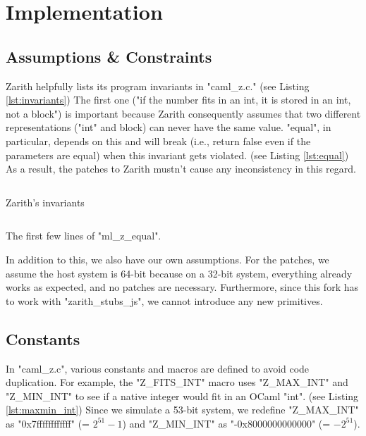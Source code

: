 \documentclass{scrartcl}
\begin{document}
\section{Implementation}

\subsection{Assumptions \& Constraints}

Zarith helpfully lists its program invariants in "caml\_z.c." (see Listing \ref{lst:invariants}) The first one ("if the number fits in an int, it is stored in an int, not a block") is important because Zarith consequently assumes that two different representations ("int" and block) can never have the same value. "equal", in particular, depends on this and will break (i.e., return false even if the parameters are equal) when this invariant gets violated. (see Listing \ref{lst:equal}) As a result, the patches to Zarith mustn't cause any inconsistency in this regard.

\begin{listing}[ht]
\inputminted[linenos, firstline=120, lastline=131]{c}{caml_z.c}
\caption{Zarith's invariants}
\label{lst:invariants}
\end{listing}

\begin{listing}[ht]
\inputminted[linenos, firstline=1116, lastline=1124]{c}{caml_z.c}
\caption{The first few lines of "ml\_z\_equal".}
\label{lst:equal}
\end{listing}

In addition to this, we also have our own assumptions. For the patches, we assume the host system is 64-bit because on a 32-bit system, everything already works as expected, and no patches are necessary. Furthermore, since this fork has to work with "zarith\_stubs\_js", we cannot introduce any new primitives.

\subsection{Constants}

In "caml\_z.c", various constants and macros are defined to avoid code duplication. For example, the "Z\_FITS\_INT" macro uses "Z\_MAX\_INT" and "Z\_MIN\_INT" to see if a native integer would fit in an OCaml "int". (see Listing \ref{lst:maxmin_int}) Since we simulate a 53-bit system, we redefine "Z\_MAX\_INT" as "0x7ffffffffffff" (= $2^{51} - 1$) and "Z\_MIN\_INT" as "-0x8000000000000" (= $-2^{51}$). \footnotemark
\end{document}
